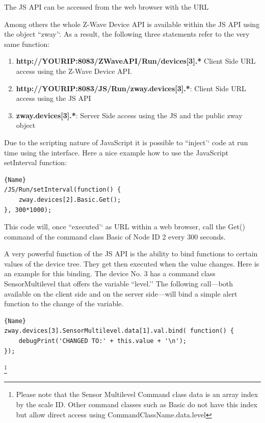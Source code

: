 The JS API can be accessed from the web browser with the URL



Among others the whole Z-Wave Device API is available within the JS API using 
the object ``zway’‘. As a result, the following three statements refer to the very same function:

\begin{enumerate}
\item \textbf{http://YOURIP:8083/ZWaveAPI/Run/devices[3].*} Client Side URL access using the Z-Wave Device API.
\item \textbf{http://YOURIP:8083/JS/Run/zway.devices[3].*}: Client Side URL access using the JS API
\item \textbf{zway.devices[3].*}: Server Side access using the JS and the public zway object
\end{enumerate}

Due to the scripting nature of JavaScript it is possible to ``inject’‘ code at run time 
using the interface. Here a nice example how to use the JavaScript setInterval function:

\begin{lstlisting}[caption=Polling of device \#2]{Name}
/JS/Run/setInterval(function() {
	zway.devices[2].Basic.Get();
}, 300*1000);
\end{lstlisting}

This code will, once ``executed’‘ as URL within a web browser, call the Get() command
of the command class Basic of Node ID 2 every 300 seconds.

A very powerful function of the JS API is the ability to bind functions to certain values 
of the device tree. They get then executed when the value changes. Here is an example 
for this binding. The device No. 3 has a command class SensorMultilevel that offers 
the variable ``level.’’ The following call---both available on the client side and 
on the server side---will bind a simple alert function to the change of the variable.

\begin{lstlisting}[caption=Bind a function]{Name}
zway.devices[3].SensorMultilevel.data[1].val.bind( function() {
	debugPrint('CHANGED TO:' + this.value + '\n');
});
\end{lstlisting}

\footnote{Please note that the Sensor Multilevel Command class data is an array index 
by the scale ID. Other command classes such as Basic do not have this index but allow 
direct access using CommandClassName.data.level}


